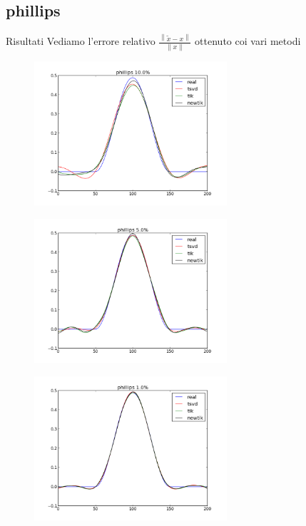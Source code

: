 \documentclass{beamer}
\theoremstyle{plain}
\theoremstyle{definition}
\theoremstyle{remark}
\newcommand{\norm}[1]{\left\|#1\right\|}
\begin{document}
\subsection{phillips}

\begin{frame}{Risultati}
  Vediamo l'errore relativo $\frac{\norm{\tilde x - x}}{\norm{x}}$
  ottenuto coi vari metodi
  \begin{center}
    
  \end{center}
\end{frame}

\begin{frame}
  \begin{figure}
    \centering
    \includegraphics[keepaspectratio,width=270px]{phillips_100.png}
  \end{figure}
\end{frame}

\begin{frame}
  \begin{figure}
    \centering
    \includegraphics[keepaspectratio,width=270px]{phillips_50.png}
  \end{figure}
\end{frame}

\begin{frame}
  \begin{figure}
    \centering
    \includegraphics[keepaspectratio,width=270px]{phillips_10.png}
  \end{figure}
\end{frame}
\end{document}
